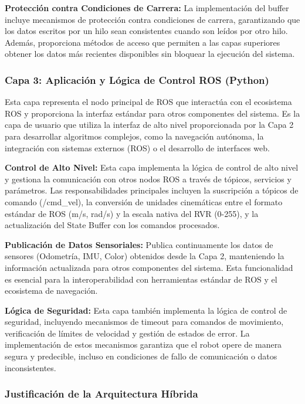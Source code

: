 \documentclass[11pt]{article}
\newcommand{\code}[1]{\textcolor{codeblue}{\url{#1}}}
\numberwithin{figure}{section}
\numberwithin{table}{section}
\def\code#1{#1}%
\begin{document}
\textbf{Protección contra Condiciones de Carrera:} La implementación del buffer incluye mecanismos de protección contra condiciones de carrera, garantizando que los datos escritos por un hilo sean consistentes cuando son leídos por otro hilo. Además, proporciona métodos de acceso que permiten a las capas superiores obtener los datos más recientes disponibles sin bloquear la ejecución del sistema.


\subsubsection{Capa 3: Aplicación y Lógica de Control ROS (Python)}

Esta capa representa el nodo principal de ROS que interactúa con el ecosistema ROS y proporciona la interfaz estándar para otros componentes del sistema. Es la capa de usuario que utiliza la interfaz de alto nivel proporcionada por la Capa 2 para desarrollar algoritmos complejos, como la navegación autónoma, la integración con sistemas externos (ROS) o el desarrollo de interfaces web.

\textbf{Control de Alto Nivel:} Esta capa implementa la lógica de control de alto nivel y gestiona la comunicación con otros nodos ROS a través de tópicos, servicios y parámetros. Las responsabilidades principales incluyen la suscripción a tópicos de comando (\code{/cmd\_vel}), la conversión de unidades cinemáticas entre el formato estándar de ROS (m/s, rad/s) y la escala nativa del RVR (0-255), y la actualización del State Buffer con los comandos procesados.

\textbf{Publicación de Datos Sensoriales:} Publica continuamente los datos de sensores (Odometría, IMU, Color) obtenidos desde la Capa 2, manteniendo la información actualizada para otros componentes del sistema. Esta funcionalidad es esencial para la interoperabilidad con herramientas estándar de ROS y el ecosistema de navegación.

\textbf{Lógica de Seguridad:} Esta capa también implementa la lógica de control de seguridad, incluyendo mecanismos de timeout para comandos de movimiento, verificación de límites de velocidad y gestión de estados de error. La implementación de estos mecanismos garantiza que el robot opere de manera segura y predecible, incluso en condiciones de fallo de comunicación o datos inconsistentes.


\subsubsection{Justificación de la Arquitectura Híbrida}
\end{document}
